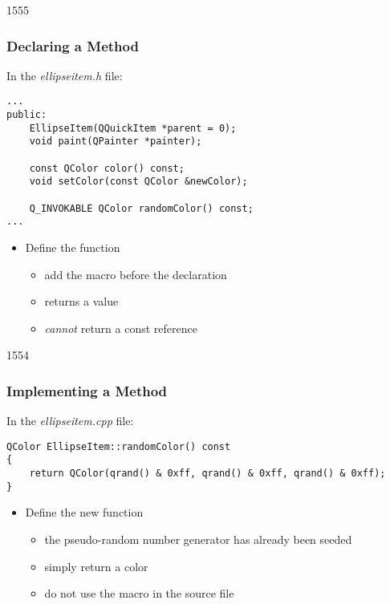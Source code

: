 \begin{slide}[fragile]{1555}\frametitle{Declaring a Method}

In the \textit{ellipseitem.h} file:

\vspace*{0.25em}
\begin{lstlisting}
...
public:
    EllipseItem(QQuickItem *parent = 0);
    void paint(QPainter *painter);

    const QColor color() const;
    void setColor(const QColor &newColor);

    Q_INVOKABLE QColor randomColor() const;
...
\end{lstlisting}

\begin{itemize}
\item Define the  function
  \begin{itemize}
  \item add the  macro before the declaration
  \item returns a  value
  \item \textit{cannot} return a const reference
  \end{itemize}
\end{itemize}

\end{slide}

\begin{slide}[fragile]{1554}\frametitle{Implementing a Method}

In the \textit{ellipseitem.cpp} file:

\vspace*{0.5em}
\begin{lstlisting}
QColor EllipseItem::randomColor() const
{
    return QColor(qrand() & 0xff, qrand() & 0xff, qrand() & 0xff);
}
\end{lstlisting}

\begin{itemize}
\item Define the new  function
  \begin{itemize}
  \item the pseudo-random number generator has already been seeded
  \item simply return a color
  \item do not use the  macro in the source file
  \end{itemize}
\end{itemize}

\end{slide}

